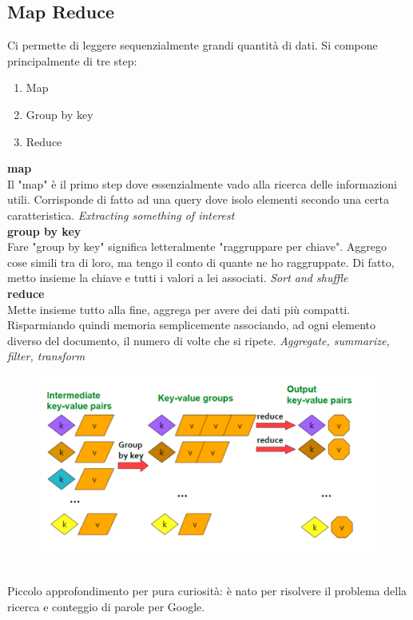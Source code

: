 \subsection{Map Reduce}
Ci permette di leggere sequenzialmente grandi quantità di dati. Si compone principalmente di tre step:
\begin{enumerate}
    \item Map
    \item Group by key
    \item Reduce
\end{enumerate}
\textbf{\large{map}}
\\[2ex]
Il "map" è il primo step dove essenzialmente vado alla ricerca delle informazioni utili. Corrisponde di fatto ad una query dove isolo elementi secondo una certa caratteristica. \textit{Extracting something of interest}
\\[2ex]
\textbf{\large{group by key}}
\\[2ex]
Fare "group by key" significa letteralmente "raggruppare per chiave". Aggrego cose simili tra di loro, ma tengo il conto di quante ne ho raggruppate. Di fatto, metto insieme la chiave e tutti i valori a lei associati. 
\textit{Sort and shuffle}
\\[2ex]
\textbf{\large{reduce}}
\\[2ex]
Mette insieme tutto alla fine, aggrega per avere dei dati più compatti. Risparmiando quindi memoria semplicemente associando, ad ogni elemento diverso del documento, il numero di volte che si ripete.
\textit{Aggregate, summarize, filter, transform}
\\
\begin{figure}[th]
    \centering
    \includegraphics[scale=0.5]{MapReduce/img/MapReduce.png}
    \label{fig:mapreduce}
\end{figure}
\\
Piccolo approfondimento per pura curiosità: è nato per risolvere il problema della ricerca e conteggio di parole per Google. 

